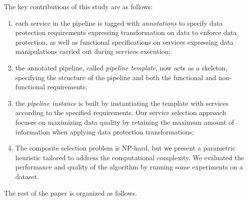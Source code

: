The key contributions of this study are as follows:
\begin{enumerate}
  \item each service in the pipeline is tagged with \textit{annotations} to specify data protection requirements expressing transformation on data to enforce data protection, as well as functional specifications on services expressing data manipulations carried out during services execution;
  \item the annotated pipeline, called \textit{pipeline template}, now acts as a skeleton, specifying the structure of the pipeline and both the functional and non-functional requirements;
  \item the \textit{pipeline instance} is built by instantiating the template with services according to the specified requirements. Our service selection approach focuses on maximizing data quality by retaining the maximum amount of information when applying data protection transformations;
  \item The composite selection problem is NP-hard, but we present a parametric heuristic tailored to address the computational
        complexity. We evaluated the performance and quality of the algorithm by running some experiments on a dataset.
\end{enumerate}

The rest of the paper is organized as follows. %
